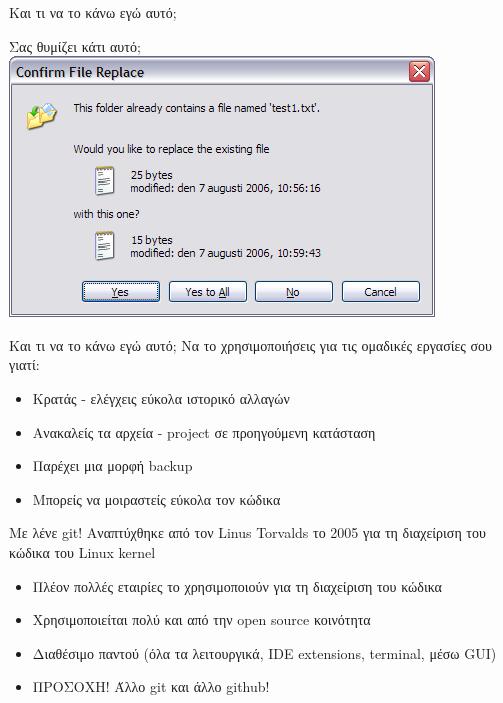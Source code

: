 \documentclass{beamer}
\begin{document}
\begin{frame}{Και τι να το κάνω εγώ αυτό;}
 \begin{center}
    Σας θυμίζει κάτι αυτό;\\
    \includegraphics[scale=0.45]{replace.png}
  \end{center}
\end{frame}

\begin{frame}{Και τι να το κάνω εγώ αυτό;}
 Να το χρησιμοποιήσεις για τις ομαδικές εργασίες σου γιατί:
  \begin{itemize}
    \item Κρατάς - ελέγχεις εύκολα ιστορικό αλλαγών
    \pause
    \item Ανακαλείς τα αρχεία - project σε προηγούμενη κατάσταση
    \pause
    \item Παρέχει μια μορφή backup
    \pause
    \item Μπορείς να μοιραστείς εύκολα τον κώδικα
  \end{itemize}
\end{frame}

\begin{frame}{Με λένε git!}
 Αναπτύχθηκε από τον Linus Torvalds το 2005 για τη διαχείριση του κώδικα του Linux kernel
  \begin{itemize}
    \item Πλέον πολλές εταιρίες το χρησιμοποιούν για τη διαχείριση του κώδικα
    \pause
    \item Χρησιμοποιείται πολύ και από την open source κοινότητα
    \pause
    \item Διαθέσιμο παντού (όλα τα λειτουργικά, IDE extensions, terminal, μέσω GUI)
    \pause
    \item ΠΡΟΣΟΧΗ! Άλλο git και άλλο github!
  \end{itemize}
\end{frame}
\end{document}

